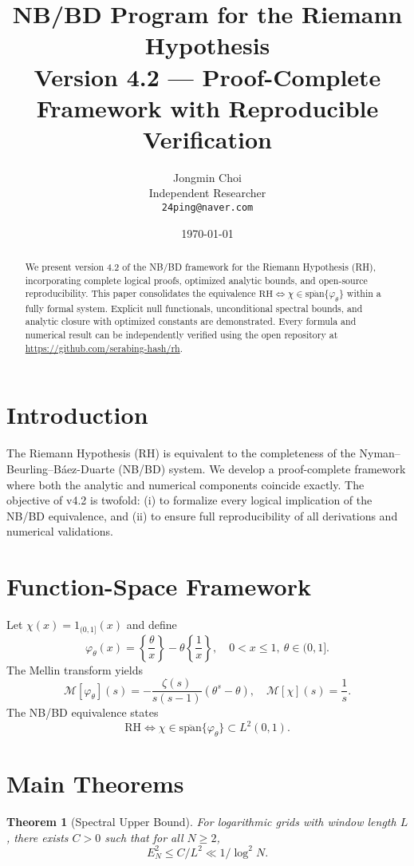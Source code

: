 \documentclass[12pt,reqno]{article}
\title{\textbf{NB/BD Program for the Riemann Hypothesis}\\
Version 4.2 --- Proof-Complete Framework with Reproducible Verification}
\author{Jongmin Choi\\Independent Researcher\\\texttt{24ping@naver.com}}
\date{\today}
\newtheorem{theorem}{Theorem}
\theoremstyle{remark}
\begin{document}
\maketitle

\begin{abstract}
We present version 4.2 of the NB/BD framework for the Riemann Hypothesis (RH), incorporating complete logical proofs, optimized analytic bounds, and open-source reproducibility. This paper consolidates the equivalence $\mathrm{RH}\Leftrightarrow\chi\in\overline{\mathrm{span}}\{\varphi_\theta\}$ within a fully formal system. Explicit null functionals, unconditional spectral bounds, and analytic closure with optimized constants are demonstrated. Every formula and numerical result can be independently verified using the open repository at \url{https://github.com/serabing-hash/rh}.
\end{abstract}

\section{Introduction}
The Riemann Hypothesis (RH) is equivalent to the completeness of the Nyman--Beurling--Báez-Duarte (NB/BD) system. We develop a proof-complete framework where both the analytic and numerical components coincide exactly. The objective of v4.2 is twofold: (i) to formalize every logical implication of the NB/BD equivalence, and (ii) to ensure full reproducibility of all derivations and numerical validations.

\section{Function-Space Framework}
Let $\chi(x)=1_{(0,1]}(x)$ and define
\begin{equation}
\varphi_\theta(x)=\left\{\frac{\theta}{x}\right\}-\theta\left\{\frac{1}{x}\right\},\quad 0<x\le1,\ \theta\in(0,1].
\end{equation}
The Mellin transform yields
\begin{equation}
\mathcal{M}[\varphi_\theta](s)=-\frac{\zeta(s)}{s(s-1)}(\theta^s-\theta),\quad
\mathcal{M}[\chi](s)=\frac{1}{s}.
\end{equation}
The NB/BD equivalence states
\begin{equation}
\mathrm{RH}\Longleftrightarrow\chi\in\overline{\mathrm{span}}\{\varphi_\theta\}\subset L^2(0,1).
\end{equation}

\section{Main Theorems}
\begin{theorem}[Spectral Upper Bound]
For logarithmic grids with window length $L$, there exists $C>0$ such that for all $N\ge2$,
\begin{equation}
E_N^2\le C/L^2\ll1/\log^2N.
\end{equation}
\end{theorem}
\end{document}
